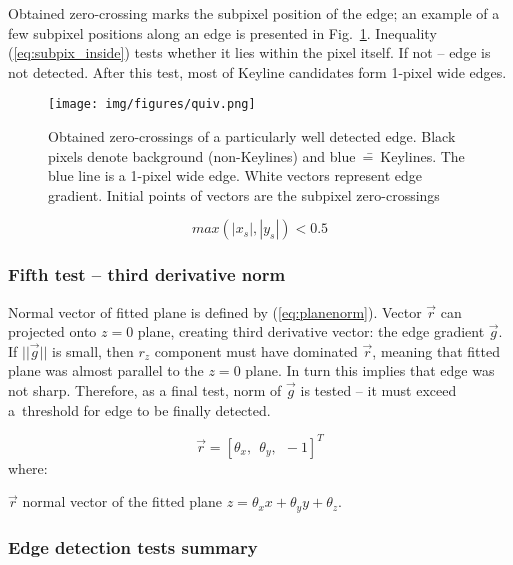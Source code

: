 Obtained zero-crossing marks the subpixel position of the edge; an example of a few subpixel positions along an edge is presented in Fig.~\ref{fig:quiv}. Inequality (\ref{eq:subpix_inside}) tests whether it lies within the pixel itself. If not -- edge is not detected. After this test, most of Keyline candidates form 1-pixel wide edges.

\begin{figure}[ht]
	\centering\texttt{[image: img/figures/quiv.png]}
	\caption{ Obtained zero-crossings of a particularly well detected edge. Black pixels denote background (non-Keylines) and blue~\==~Keylines. The blue line is a 1-pixel wide edge. White vectors represent edge gradient. Initial points of vectors are the subpixel zero-crossings }
	\label{fig:quiv}
\end{figure}

\begin{equation}
max(|x_s|, |y_s|) < 0.5
\label{eq:subpix_inside}
\end{equation}

\subsubsection*{Fifth test -- third derivative norm}
\label{edge_fith}

Normal vector of fitted plane is defined by (\ref{eq:planenorm}). Vector $\vec{r}$ can projected onto $z=0$ plane, creating third derivative vector: the edge gradient $\vec{g}$. If $||\vec{g}||$ is small, then $r_{z}$ component must have dominated $\vec{r}$, meaning that fitted plane was almost parallel to the $z=0$ plane. In turn this implies that edge was not sharp. Therefore, as a final test, norm of $\vec{g}$ is tested -- it must exceed a~threshold for edge to be finally detected.

\begin{equation}
\vec{r} = [\theta_{x},\ \ \theta_{y},\ \ -1]^T
\label{eq:planenorm}
\end{equation}
where:
\begin{eqwhere}[2cm]
	\item[$\vec{r}$] normal vector of the fitted plane $z = \theta_{x}x + \theta_{y}y + \theta_{z}$.
\end{eqwhere}

\subsubsection*{Edge detection tests summary}

